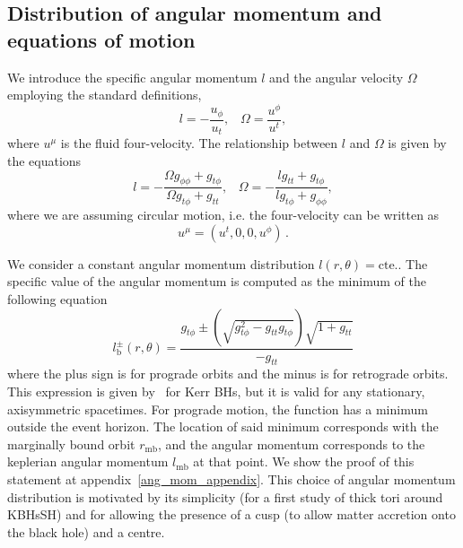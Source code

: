 \documentclass[twocolumn,aps,showpacs,showkeys,prd,superscriptaddress,byrevtex, amsmath]{revtex4-1}
\begin{document}
\subsection{Distribution of angular momentum and equations of motion}

We introduce the specific angular momentum $l$ and the angular velocity $\Omega$ employing the standard definitions,
\begin{equation}
l = - \frac{u_{\phi}}{u_t}, \;\;\; \Omega = \frac{u^{\phi}}{u^t},
\end{equation}
where $u^{\mu}$ is the fluid four-velocity.
The relationship between $l$ and $\Omega$ is given by the equations
\begin{equation}
l = - \frac{\Omega g_{\phi\phi} + g_{t\phi}}{\Omega g_{t\phi} + g_{tt}}, \;\;\; \Omega = - \frac{l g_{tt} + g_{t\phi}}{l g_{t\phi} + g_{\phi\phi}},
\end{equation}
where we are assuming circular motion, i.e. the four-velocity can be written as
\begin{equation}
u^{\mu} = (u^t, 0, 0, u^{\phi})\,.
\end{equation}

We consider a constant angular momentum distribution $l(r,\theta) = \mathrm{cte}.$. The specific value of the angular momentum is computed as the minimum of the following equation
\begin{equation}\label{eq:mb_ang_mom}
l^{\pm}_{\mathrm{b}}(r, \theta) = \frac{g_{t\phi}\pm\left(\sqrt{g_{t\phi}^2-g_{tt}g_{t\phi}}\right)\sqrt{1+g_{tt}}}{-g_{tt}}
\end{equation}
where the plus sign is for prograde orbits and the minus is for retrograde orbits.
This expression is given by~\citep{Daigne:2004} for Kerr BHs, but it is valid for any stationary, axisymmetric spacetimes. For prograde motion, the function has a minimum outside the event horizon. The location of said minimum corresponds with the marginally bound orbit $r_{\mathrm{mb}}$, and the angular momentum corresponds to the keplerian angular momentum $l_{\mathrm{mb}}$ at that point. We show the proof of this statement at appendix~\ref{ang_mom_appendix}. This choice of angular momentum distribution is motivated by its simplicity (for a first study of thick tori around KBHsSH) and for allowing the presence of a cusp (to allow matter accretion onto the black hole) and a centre.
\end{document}
